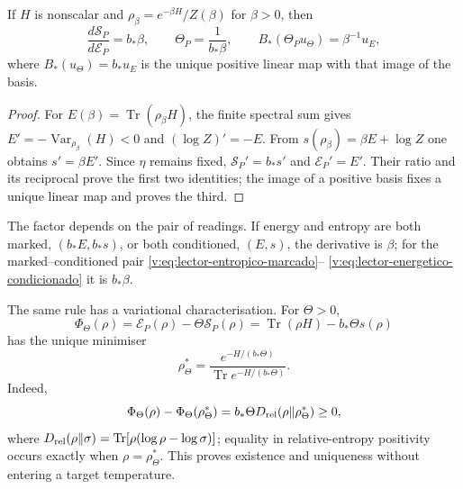 \begin{theorem}
\label{v:thm:derivada-termometrica-marcada}
If $H$ is nonscalar and $\rho_\beta=e^{-\beta H}/Z(\beta)$ for $\beta>0$,
then
\begin{equation}
 \frac{d\mathcal S_P}{d\mathcal E_P}=b_*\beta,
 \qquad \Theta_P=\frac1{b_*\beta},
 \qquad B_*(\Theta_Pu_\Theta)=\beta^{-1}u_E,
 \label{v:eq:derivada-termometrica-marcada}
\end{equation}
where $B_*(u_\Theta)=b_*u_E$ is the unique positive linear map with that image
of the basis.
\end{theorem}
\begin{proof}
For $E(\beta)=\operatorname{Tr}(\rho_\beta H)$, the finite spectral sum
gives $E'=-\operatorname{Var}_{\rho_\beta}(H)<0$ and
$(\log Z)'=-E$. From
$s(\rho_\beta)=\beta E+\log Z$ one obtains $s'=\beta E'$. Since $\eta$
remains fixed, $\mathcal S_P'=b_*s'$ and $\mathcal E_P'=E'$. Their ratio
and its reciprocal prove the first two identities; the image of a positive
basis fixes a unique linear map and proves the third.
\end{proof}

The factor depends on the pair of readings. If energy and entropy are both
marked, $(b_*E,b_*s)$, or both conditioned, $(E,s)$, the derivative is
$\beta$; for the marked--conditioned pair
\eqref{v:eq:lector-entropico-marcado}--
\eqref{v:eq:lector-energetico-condicionado} it is $b_*\beta$.

The same rule has a variational characterisation. For $\Theta>0$,
\begin{equation}
 \Phi_\Theta(\rho)=\mathcal E_P(\rho)-\Theta\mathcal S_P(\rho)
 =\operatorname{Tr}(\rho H)-b_*\Theta s(\rho)
 \label{v:eq:funcional-variacional-marcado}
\end{equation}
has the unique minimiser
\begin{equation}
 \rho_\Theta^*=\frac{e^{-H/(b_*\Theta)}}
                    {\operatorname{Tr}e^{-H/(b_*\Theta)}}.
 \label{v:eq:minimo-variacional-marcado}
\end{equation}
Indeed,
\[
 \Phi_\Theta(\rho)-\Phi_\Theta(\rho_\Theta^*)
 =b_*\Theta D_{\rm rel}(\rho\Vert\rho_\Theta^*)\ge0,
\]
where
$D_{\rm rel}(\rho\Vert\sigma)
=\operatorname{Tr}[\rho(\log\rho-\log\sigma)]$; equality in
relative-entropy positivity occurs exactly when
$\rho=\rho_\Theta^*$. This proves existence and uniqueness without entering
a target temperature.

